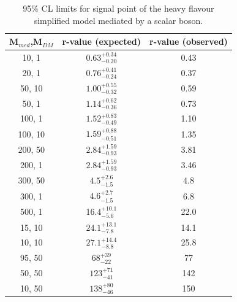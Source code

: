 \begin{table}[h!]
    \caption{%
    95\% CL limits for signal point of the heavy flavour simplified model 
    mediated by a scalar boson. }
    \label{tab:DMttS_limits}
    \centering
    \begin{tabular}{ ccc }
        \hline\hline
        M$_{med}$,M$_{DM}$ & r-value (expected) & r-value (observed) \\ 
        \hline
        10, 1   & $0.63_{-0.20}^{+0.34}$ & 0.43 \\
        20, 1   & $0.76_{-0.24}^{+0.41}$ & 0.37 \\
        50, 10  & $1.00_{-0.32}^{+0.55}$ & 0.59 \\
        50, 1   & $1.14_{-0.36}^{+0.62}$ & 0.73 \\
        100, 1  & $1.52_{-0.49}^{+0.83}$ & 1.10 \\
        100, 10 & $1.59_{-0.51}^{+0.88}$ & 1.35 \\
        200, 50 & $2.84_{-0.93}^{+1.59}$ & 3.81 \\
        200, 1  & $2.84_{-0.93}^{+1.59}$ & 3.46 \\
        300, 50 & $4.5_{-1.5}^{+2.6}$    & 4.8  \\
        300, 1  & $4.6_{-1.5}^{+2.7}$    & 6.8  \\
        500, 1  & $16.4_{-5.6}^{+10.1}$  & 22.0 \\
        15, 10  & $24.1_{-7.8}^{+13.1}$  & 14.1 \\
        10, 10  & $27.1_{-8.8}^{+14.4}$  & 25.8 \\
        95, 50  & $68_{-22}^{+39}$       & 77   \\
        50, 50  & $123_{-41}^{+71}$      & 142  \\
        10, 50  & $138_{-46}^{+80}$      & 150  \\
        \hline\hline
    \end{tabular}
\end{table}

